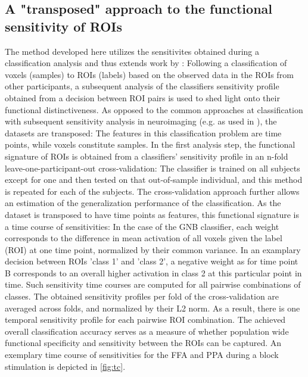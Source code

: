 \documentclass[a4paper, 12pt]{scrreprt}
\begin{document}
\subsection{A "transposed" approach to the functional sensitivity of ROIs}
The method developed here utilizes the sensitivites obtained during a classification analysis and thus extends work by \textcite{nastase2016}: Following a classification of voxels (samples) to ROIs (labels) based on the observed data in the ROIs from other participants, a subsequent analysis of the classifiers sensitivity profile obtained from a decision between ROI pairs is used to shed light onto their functional distinctiveness. As opposed to the common approaches at classification with subsequent sensitivity analysis in neuroimaging (e.g. as used in \textcite{poldrack2009decoding}), the datasets are transposed: The features in this classification problem are time points, while voxels constitute samples. \newline
In the first analysis step, the functional signature of ROIs is obtained from a classifiers' sensitivity profile in an n-fold leave-one-participant-out cross-validation: The classifier is trained on all subjects except for one and then tested on that out-of-sample individual, and this method is repeated for each of the subjects. The cross-validation approach further allows an estimation of the generalization performance of the classification. As the dataset is transposed to have time points as features, this functional signature is a time course of sensitivities: In the case of the GNB classifier, each weight corresponds to the difference in mean activation of all voxels given the label (ROI) at one time point, normalized by their common variance. In an examplary decision between ROIs 'class 1' and 'class 2', a negative weight as for time point B corresponds to an overall higher activation in class 2 at this particular point in time. Such sensitivity time courses are computed for all pairwise combinations of classes. The obtained sensitivity profiles per fold of the cross-validation are averaged across folds, and normalized by their L2 norm. As a result, there is one temporal sensitivity profile for each pairwise ROI combination. The achieved overall classification accuracy serves as a measure of whether population wide functional specificity and sensitivity between the ROIs can be captured. An exemplary time course of sensitivities for the FFA and PPA during a block stimulation is depicted in \ref{fig:tc}. \newline
\end{document}

